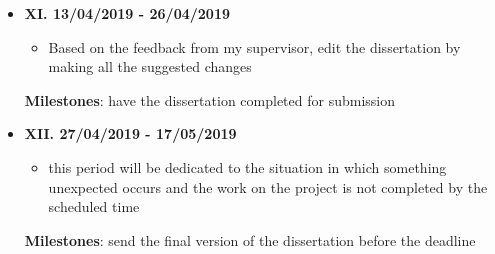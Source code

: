 \begin{itemize}
  \item \textbf{XI. 13/04/2019 - 26/04/2019}

        \begin{itemize}
          \item Based on the feedback from my supervisor, edit the dissertation by making all the suggested changes
        \end{itemize}

        \textbf{Milestones}: have the dissertation completed for submission\\


  \item \textbf{XII. 27/04/2019 - 17/05/2019}

        \begin{itemize}
          \item this period will be dedicated to the situation in which something unexpected occurs and the work on the project is not completed by the scheduled time
        \end{itemize}

        \textbf{Milestones}: send the final version of the dissertation before the deadline

\end{itemize}



